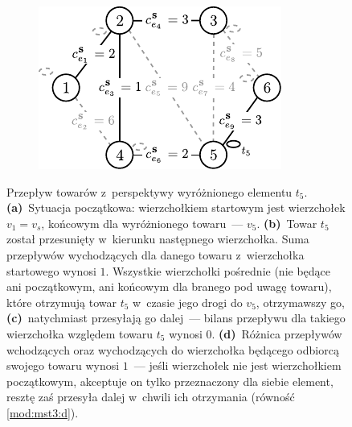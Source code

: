 \begin{figure}[!htbp]
\begin{subfigure}[b]{0.242\textwidth}
		\caption{}
		\label{fig:mst4Example:c}
	\end{subfigure}
	\hfill
	\begin{subfigure}[b]{0.242\textwidth}
		\includegraphics[width=\textwidth]{Chapter_III/MST4-example/d}
		\caption{}
		\label{fig:mst4Example:d}
	\end{subfigure}
	\hfill\null
	\caption{
		Przepływ towarów z~perspektywy wyróżnionego elementu $t_{5}$.
		\textbf{(a)}~Sytuacja początkowa: wierzchołkiem startowym jest wierzchołek $v_{1} = v_{s}$, końcowym dla wyróżnionego towaru~--- $v_{5}$.
		\textbf{(b)}~Towar $t_{5}$ został przesunięty w~kierunku następnego wierzchołka.
		Suma przepływów wychodzących dla danego towaru z~wierzchołka startowego wynosi $1$.
		Wszystkie wierzchołki pośrednie (nie będące ani początkowym, ani końcowym dla branego pod uwagę towaru), które otrzymują towar $t_{5}$ w~czasie jego drogi do $v_{5}$, otrzymawszy go,
		\textbf{(c)}~natychmiast przesyłają go dalej~--- bilans przepływu dla takiego wierzchołka względem towaru $t_{5}$ wynosi $0$.
		\textbf{(d)}~Różnica przepływów wchodzących oraz wychodzących do wierzchołka będącego odbiorcą swojego towaru wynosi $1$~--- jeśli wierzchołek nie jest wierzchołkiem początkowym, akceptuje on tylko przeznaczony dla siebie element, resztę zaś przesyła dalej w~chwili ich otrzymania (równość \ref{mod:mst3:d}).
	}
	\label{fig:mst4Example}
\end{figure}

